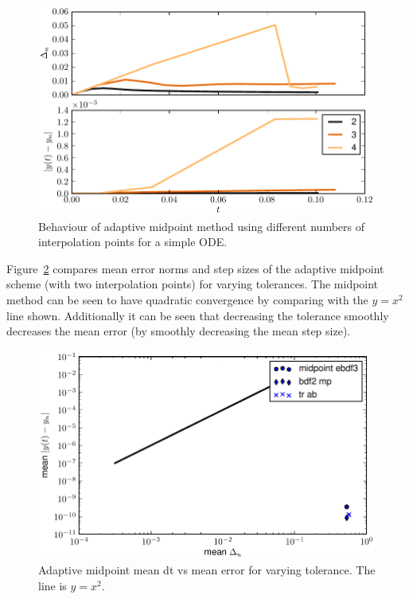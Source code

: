 \begin{figure}[ht!]
  \centering
  \includegraphics{images/mp_ninterp}
  \caption{Behaviour of adaptive midpoint method using different numbers of interpolation points for a simple ODE.}
  \label{fig:mp-ninterp}
\end{figure}


Figure~\ref{fig:mp-tols} compares mean error norms and step sizes of the adaptive midpoint scheme (with two interpolation points) for varying tolerances.
The midpoint method can be seen to have quadratic convergence by comparing with the $y=x^2$ line shown.
Additionally it can be seen that decreasing the tolerance smoothly decreases the mean error (by smoothly decreasing the mean step size).

\begin{figure}[ht!]
  \centering
  \includegraphics{images/mp_tols}
  \caption{Adaptive midpoint mean dt vs mean error for varying tolerance. The line is $y = x^2$.}
  \label{fig:mp-tols}
\end{figure}



